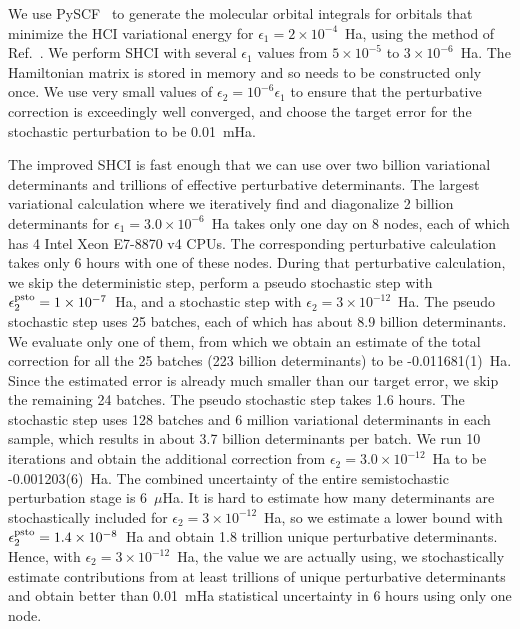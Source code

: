 \documentclass[%
reprint,
 superscriptaddress,
 amsmath,amssymb,
 aps,
]{revtex4-1}
\begin{document}
We use PySCF~\cite{SunCha_etal_PySCF-ComMolSci-18} to generate the molecular orbital integrals for orbitals that minimize the HCI variational
energy for $\epsilon_1=2\times 10^{-4}$~Ha, using the method of Ref.~\cite{SmiMusHolSha-JCTC-17}.
We perform SHCI with several $\epsilon_1$ values from $5\times10^{-5}$ to $3\times10^{-6}$~Ha.
The Hamiltonian matrix is stored in memory and so needs to be constructed only once.
We use very small values of $\epsilon_2 = 10^{-6} \epsilon_1$  to ensure that the perturbative correction is exceedingly well converged,
and choose the target error for the stochastic perturbation to be 0.01~mHa.

The improved SHCI is fast enough that we can use over two billion variational determinants and trillions of effective perturbative determinants.
The largest variational calculation where we iteratively find and diagonalize 2 billion determinants for $\epsilon_1=3.0\times10^{-6}$~Ha takes only one day on 8 nodes, each of which has 4 Intel Xeon E7-8870 v4 CPUs.
The corresponding perturbative calculation takes only 6 hours with one of these nodes. 
During that perturbative calculation, we skip the deterministic step, perform a pseudo stochastic step with $\epsilon_2^{\rm psto}=1\times10^{-7}$~Ha, and a stochastic step with $\epsilon_2=3\times10^{-12}$~Ha.
The pseudo stochastic step uses 25 batches, each of which has about 8.9 billion determinants.
We evaluate only one of them, from which we obtain an estimate of the total correction for all the 25 batches (223 billion determinants) to be -0.011681(1)~Ha.
Since the estimated error is already much smaller than our target error, we skip the remaining 24 batches.
The pseudo stochastic step takes 1.6 hours.
The stochastic step uses 128 batches and 6 million variational determinants in each sample,
which results in about 3.7 billion determinants per batch.
We run 10 iterations and obtain the additional correction from $\epsilon_2=3.0\times10^{-12}$~Ha to be -0.001203(6)~Ha.
The combined uncertainty of the entire semistochastic perturbation stage is 6~$\mu$Ha.
It is hard to estimate how many determinants are stochastically included for $\epsilon_2=3\times10^{-12}$~Ha, so we estimate a lower bound with $\epsilon_2^{\rm psto}=1.4\times10^{-8}$~Ha and obtain 1.8 trillion unique perturbative determinants.
Hence, with $\epsilon_2=3\times10^{-12}$~Ha, the value we are actually using, we stochastically estimate contributions from at least trillions of unique perturbative determinants and obtain better than 0.01~mHa statistical uncertainty in 6 hours using only one node.
\end{document}

